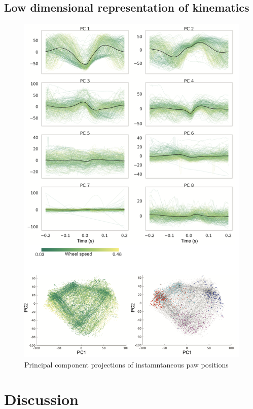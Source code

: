 \subsection{Low dimensional representation of kinematics}

\begin{figure}
    \centering
    \includegraphics[width=1\linewidth]{Chapters//Figures//chapter2/behavioral_PCA.png}
    \caption{Principal component projections of instamntaneous paw positions}
    \label{fig:behav-pca}
\end{figure}

\section{Discussion}
